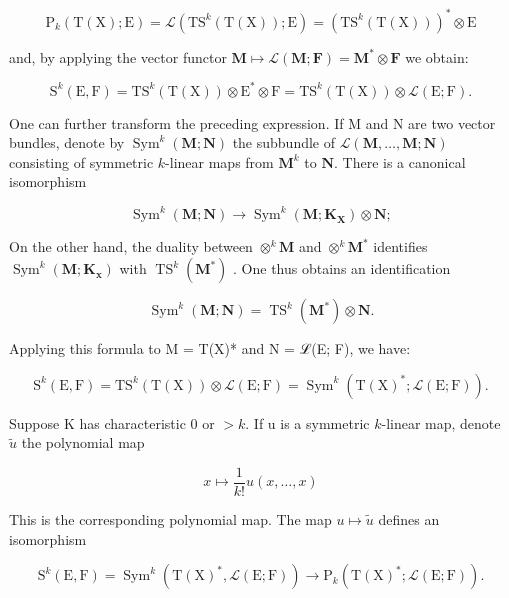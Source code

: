 \[
\mathrm{P} _ {k} (\mathrm{T} (\mathrm{X}); \mathrm{E}) = \mathscr {L} (\mathrm{TS} ^ {k} (\mathrm{T} (\mathrm{X})); \mathrm{E}) = (\mathrm{TS} ^ {k} (\mathrm{T} (\mathrm{X}))) ^ {*} \otimes \mathrm{E}
\]

and, by applying the vector functor \(\mathbf{M} \mapsto \mathcal{L}(\mathbf{M}; \mathbf{F}) = \mathbf{M}^* \otimes \mathbf{F}\) we obtain:

\[
\mathrm{S} ^ {k} (\mathrm{E}, \mathrm{F}) = \mathrm{T} \mathrm{S} ^ {k} (\mathrm{T} (\mathrm{X})) \otimes \mathrm{E} ^ {*} \otimes \mathrm{F} = \mathrm{T} \mathrm{S} ^ {k} (\mathrm{T} (\mathrm{X})) \otimes \mathscr {L} (\mathrm{E}; \mathrm{F}).
\]

One can further transform the preceding expression. If M and N are two vector bundles, denote by \(\operatorname{Sym}^{k}(\mathbf{M};\mathbf{N})\) the subbundle of \(\mathcal{L}(\mathbf{M},\ldots,\mathbf{M};\mathbf{N})\) consisting of symmetric \(k\)-linear maps from \(\mathbf{M}^{k}\) to \(\mathbf{N}\). There is a canonical isomorphism

\[
\operatorname{Sym} ^ {k} (\mathbf {M}; \mathbf {N}) \rightarrow \operatorname{Sym} ^ {k} (\mathbf {M}; \mathbf {K} _ {\mathbf {X}}) \otimes \mathbf {N};
\]

On the other hand, the duality between \(\otimes^{k}\mathbf{M}\) and \(\otimes^{k}\mathbf{M}^{*}\) identifies \(\operatorname{Sym}^{k}(\mathbf{M};\mathbf{K}_{\mathbf{x}})\) with \(\operatorname{TS}^{k}(\mathbf{M}^{*})\) . One thus obtains an identification

\[
\operatorname{Sym} ^ {k} (\mathbf {M}; \mathbf {N}) = \operatorname{TS} ^ {k} (\mathbf {M} ^ {*}) \otimes \mathbf {N}.
\]

Applying this formula to M = T(X)* and N = ℒ(E; F), we have:

\[
\mathrm{S} ^ {k} (\mathrm{E}, \mathrm{F}) = \mathrm{T} \mathrm{S} ^ {k} (\mathrm{T} (\mathrm{X})) \otimes \mathscr {L} (\mathrm{E}; \mathrm{F}) = \operatorname{Sym} ^ {k} (\mathrm{T} (\mathrm{X}) ^ {*}; \mathscr {L} (\mathrm{E}; \mathrm{F})).
\]

Suppose K has characteristic 0 or \(>k\). If u is a symmetric \(k\)-linear map, denote \(\tilde{u}\) the polynomial map

\[
x \mapsto \frac {1}{k !} u (x, \dots , x)
\]

This is the corresponding polynomial map. The map \(u \mapsto \tilde{u}\) defines an isomorphism

\[
\mathrm{S} ^ {k} (\mathrm{E}, \mathrm{F}) = \operatorname{Sym} ^ {k} (\mathrm{T} (\mathrm{X}) ^ {*}, \mathscr {L} (\mathrm{E}; \mathrm{F})) \rightarrow \mathrm{P} _ {k} (\mathrm{T} (\mathrm{X}) ^ {*}; \mathscr {L} (\mathrm{E}; \mathrm{F})).
\]

